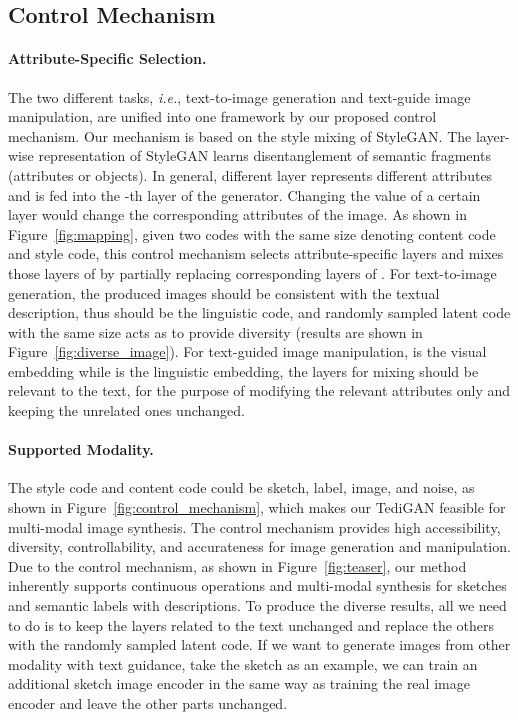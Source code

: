 \documentclass[final]{cvpr}
\def\ie{\emph{i.e.}}
\begin{document}
\subsection{Control Mechanism}
\label{subsec:control_mechanism}
\paragraph{Attribute-Specific Selection.} 
The two different tasks, \ie, text-to-image generation and text-guide image manipulation, are unified into one framework by our proposed control mechanism. 
Our mechanism is based on the style mixing of StyleGAN.
The layer-wise representation of StyleGAN learns disentanglement of semantic fragments (attributes or objects).
In general, different layer  represents different attributes and is fed into the -th layer of the generator. 
Changing the value of a certain layer would change the corresponding attributes of the image.
As shown in Figure~\ref{fig:mapping}, given two codes with the same size  denoting content code and style code, this control mechanism selects attribute-specific layers and mixes those layers of  by partially replacing corresponding layers of . 
For text-to-image generation, the produced images should be consistent with the textual description, thus  should be the linguistic code, and randomly sampled latent code with the same size acts as  to provide diversity (results are shown in Figure~\ref{fig:diverse_image}). 
For text-guided image manipulation,  is the visual embedding while  is the linguistic embedding, the layers for mixing should be relevant to the text, for the purpose of modifying the relevant attributes only and keeping the unrelated ones unchanged.

\vspace{-5pt}
\paragraph{Supported Modality.} 
The style code  and content code  could be sketch, label, image, and noise, as shown in Figure~\ref{fig:control_mechanism}, which makes our TediGAN feasible for multi-modal image synthesis.
The control mechanism provides high accessibility, diversity, controllability, and accurateness for image generation and manipulation.
Due to the control mechanism, as shown in Figure~\ref{fig:teaser}, our method inherently supports continuous operations and multi-modal synthesis for sketches and semantic labels with descriptions.
To produce the diverse results, all we need to do is to keep the layers related to the text unchanged and replace the others with the randomly sampled latent code.
If we want to generate images from other modality with text guidance, take the sketch as an example, we can train an additional sketch image encoder  in the same way as training the real image encoder and leave the other parts unchanged.
\end{document}
